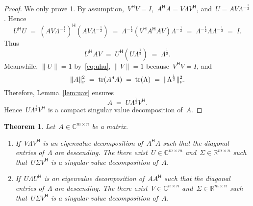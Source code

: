 \documentclass[11pt,a4paper]{article}
\newtheorem{theorem}{Theorem}%
\theoremstyle{definition}
\def\real{\mathbb{R}}
\def\CC{\mathbb{C}}
\DeclareMathOperator{\tr}{tr}
\newcommand{\fro}{{\scriptscriptstyle{\textnormal{F}}}}
\newcommand{\hmt}{{\scriptscriptstyle{{\mathsf{H}}}}}
\begin{document}
\begin{proof}
  We only prove 1. By assumption,~$V^\hmt V=I$,~$A^\hmt A = V\Lambda V^\hmt$, 
  and~$U = A V\Lambda^{-\frac{1}{2}}$. Hence
  \begin{equation}
    \label{eq:uhu}
    U^\hmt U \;=\;  (A V\Lambda^{-\frac{1}{2}})^\hmt  (AV\Lambda^{-\frac{1}{2}}) 
    \;=\; \Lambda^{-\frac{1}{2}}(V^\hmt A^\hmt A V)\Lambda^{-\frac{1}{2}}
    \;=\; \Lambda^{-\frac{1}{2}}\Lambda\Lambda^{-\frac{1}{2}} \;=\; I.
  \end{equation}
  Thus 
  \begin{equation*}
    U^\hmt A V \;=\; U^\hmt (U\Lambda^{\frac{1}{2}}) \;=\; \Lambda^{\frac{1}{2}}. 
  \end{equation*}
  Meanwhile, $\|U\|=1$ by~\eqref{eq:uhu}, $\|V\|=1$ because~$V^\hmt V = I$, and
  \begin{equation*}
    \|A\|_\fro^2 \;=\; \tr(A^\hmt A) \;=\; \tr(\Lambda) \;=\; \|\Lambda^{\frac{1}{2}}\|_\fro^2.
  \end{equation*}
  Therefore, Lemma~\ref{lem:uav} ensures
  \begin{equation}
    \nonumber
    A \;=\; U\Lambda^{\frac{1}{2}}V^\hmt.
  \end{equation}
  Hence~$U\Lambda^{\frac{1}{2}}V^\hmt$ is a compact singular value decomposition of~$A$. 
\end{proof}

\begin{theorem}
  \label{th:eyfull}
  Let~$A \in \CC^{m\times n}$ be a matrix.
  \begin{enumerate}[leftmargin=1.5em]
    \item If~$V\Lambda V^\hmt$ is an eigenvalue decomposition of~$A^\hmt A$ such
      that the diagonal entries of~$\Lambda$ are descending. The there exist~$U\in \CC^{m\times m}$
      and~$\Sigma \in \real^{m\times n}$ such that~$U\Sigma V^\hmt$ is a singular value decomposition of~$A$.
    \item If~$U\Lambda U^\hmt$ is an eigenvalue decomposition of~$AA^\hmt$ such
      that the diagonal entries of~$\Lambda$ are descending. The there exist~$V\in \CC^{n\times n}$
      and~$\Sigma \in \real^{m\times n}$ such that~$U\Sigma V^\hmt$ is a singular value decomposition of~$A$.
  \end{enumerate}
\end{theorem}
\end{document}
